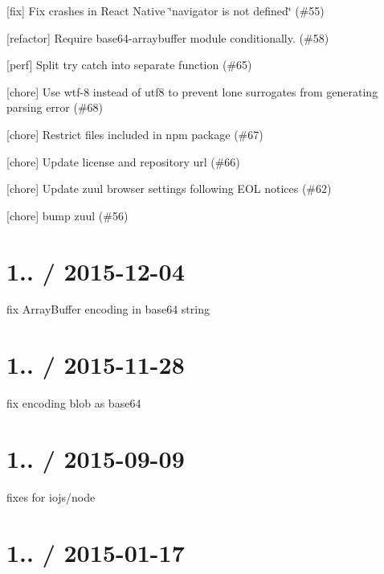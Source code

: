 \begin{DoxyItemize}
\item \mbox{[}fix\mbox{]} Fix crashes in React Native \char`\"{}navigator is not defined\char`\"{} (\#55)
\item \mbox{[}refactor\mbox{]} Require base64-\/arraybuffer module conditionally. (\#58)
\item \mbox{[}perf\mbox{]} Split try catch into separate function (\#65)
\item \mbox{[}chore\mbox{]} Use wtf-\/8 instead of utf8 to prevent lone surrogates from generating parsing error (\#68)
\item \mbox{[}chore\mbox{]} Restrict files included in npm package (\#67)
\item \mbox{[}chore\mbox{]} Update license and repository url (\#66)
\item \mbox{[}chore\mbox{]} Update zuul browser settings following E\+OL notices (\#62)
\item \mbox{[}chore\mbox{]} bump zuul (\#56)
\end{DoxyItemize}

\section*{1.. / 2015-\/12-\/04 }


\begin{DoxyItemize}
\item fix {\ttfamily Array\+Buffer} encoding in base64 string
\end{DoxyItemize}

\section*{1.. / 2015-\/11-\/28 }


\begin{DoxyItemize}
\item fix encoding blob as base64
\end{DoxyItemize}

\section*{1.. / 2015-\/09-\/09 }


\begin{DoxyItemize}
\item fixes for iojs/node
\end{DoxyItemize}

\section*{1.. / 2015-\/01-\/17 }



